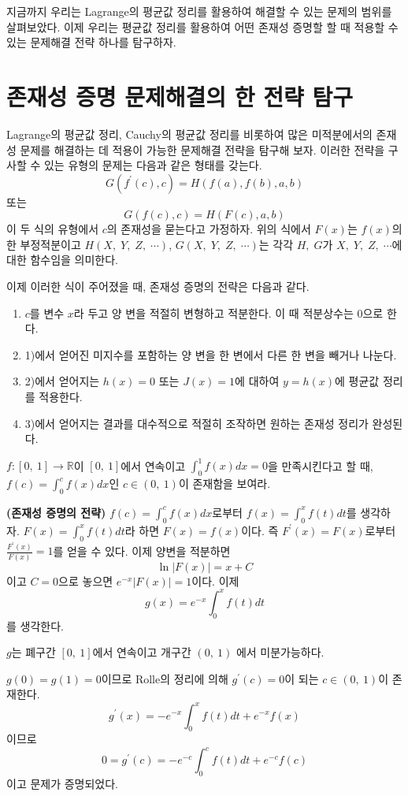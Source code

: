 \documentclass[a4paper]{article}
\begin{document}
지금까지 우리는 Lagrange의 평균값 정리를 활용하여 해결할 수 있는 문제의 범위를 살펴보았다. 이제 우리는 평균값 정리를 활용하여 어떤 존재성 증명할 할 때 적용할 수 있는 문제해결 전략 하나를 탐구하자.


\section{존재성 증명 문제해결의 한 전략 탐구}

 Lagrange의 평균값 정리, Cauchy의 평균값 정리를 비롯하여 많은 미적분에서의 존재성 문제를 해결하는 데 적용이 가능한 문제해결 전략을 탐구해 보자. 이러한 전략을 구사할 수 있는 유형의 문제는 다음과 같은 형태를 갖는다.
 \[
 G(f^{\prime}(c), c) = H(f(a), f(b), a, b)
 \]
 또는
 \[
 G(f(c), c) = H(F(c), a, b)
 \]
이 두 식의 유형에서 $c$의 존재성을 묻는다고 가정하자.  위의 식에서 $F(x)$는 $f(x)$의 한 부정적분이고 $H(X, \;Y, \;Z,\; \cdots )$, $G(X,\;Y,\;Z, \; \cdots)$는 각각 $H, \;G$가 $X,\; Y,\; Z,\; \cdots$에 대한 함수임을 의미한다.


 이제  이러한 식이 주어졌을 때, 존재성 증명의 전략은 다음과 같다.
 \begin{enumerate}[label = \arabic*)]
 	\item  $c$를 변수 $x$라 두고 양 변을 적절히 변형하고  적분한다. 이 때 적분상수는 $0$으로 한다.
 	\item 1)에서 얻어진 미지수를 포함하는 양 변을 한 변에서 다른 한 변을 빼거나 나눈다.
 	\item 2)에서 얻어지는 $h(x)=0$ 또는 $J(x)=1$에 대하여 $y=h(x)$에 평균값 정리를 적용한다.
 	\item 3)에서 얻어지는 결과를 대수적으로 적절히 조작하면 원하는 존재성 정리가 완성된다.
 \end{enumerate}

\begin{example}
	$f:[0,\: 1]\to\mathbb{R}$이 $[0,\: 1]$에서 연속이고 $\int_{0}^{1}f(x)dx=0$을 만족시킨다고 할 때, $f(c)=\int_{0}^{c}f(x)dx$인 $c\in(0,\: 1)$이 존재함을 보여라. 
	\begin{solution}
		\textbf{(존재성 증명의 전략)} $f(c)=\int_{0}^{c}f(x)dx$로부터 $f(x)=\int_{0}^{x}f(t)dt$를 생각하자.  $F(x)=\int_{0}^{x}f(t)dt$라 하면 $F(x)=f(x)$이다. 즉 $F^{\prime}(x)= F(x)$로부터 $\frac{F^{\prime}(x)}{F(x)}=1$를 얻을 수 있다. 이제 양변을 적분하면
		\[
		\ln \vert F(x)\vert =x+C
		\]
		이고 $C=0$으로 놓으면 $e^{-x}\vert F(x)\vert =1$이다. 이제 
		\[
		g(x)=e^{-x}\int_{0}^{x}f(t)dt
		\]
		를 생각한다.
		
		$g$는 폐구간 $[0,\: 1]$에서 연속이고 개구간 $(0,\: 1)$ 에서 미분가능하다.
		
		$g(0)=g(1)=0$이므로  Rolle의 정리에 의해 $g^{\prime}(c)=0$이 되는 $c\in(0,\: 1)$이 존재한다. 
		\[
		g^{\prime}(x)= - e^{-x}\int_{0}^{x}f(t)dt +e^{-x}f(x)
		\]
		이므로 
		\[
		0 = g^{\prime}(c)= -e^{-c}\int_{0}^{c}f(t)dt + e^{-c}f(c)
		\]
		이고 문제가 증명되었다.
	\end{solution}
\end{example}
\vspace{1em}
\end{document}
